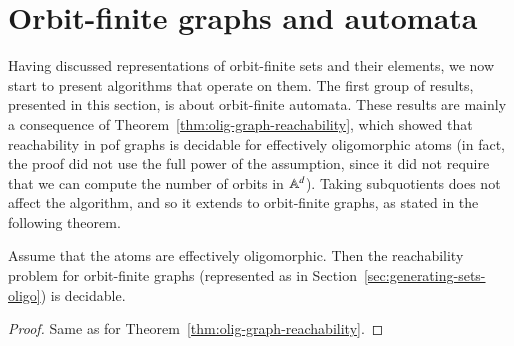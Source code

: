 


	\section{Orbit-finite graphs and automata}
	\label{sec:orbit-finite-automata} 
Having discussed representations of orbit-finite sets and their elements, we now start to present algorithms that operate on them. The first group of results, presented in this section, is about orbit-finite automata. These results are  mainly a consequence of   Theorem~\ref{thm:olig-graph-reachability}, which showed that  reachability in pof graphs is decidable for effectively oligomorphic atoms (in fact, the proof did not use the full power of the assumption, since it did not require that we can compute the number of orbits in $\mathbb A^d$).  Taking subquotients does not affect the algorithm, and so it extends to orbit-finite graphs, as stated in the following theorem.  

	\begin{theorem}\label{thm:oligo-spof-graph-reachability}
		Assume that the atoms are effectively oligomorphic.
		Then the reachability problem for orbit-finite graphs (represented as in Section~\ref{sec:generating-sets-oligo}) is decidable. 
		\end{theorem}
		\begin{proof}
			Same as  for Theorem~\ref{thm:olig-graph-reachability}.
		\end{proof}

